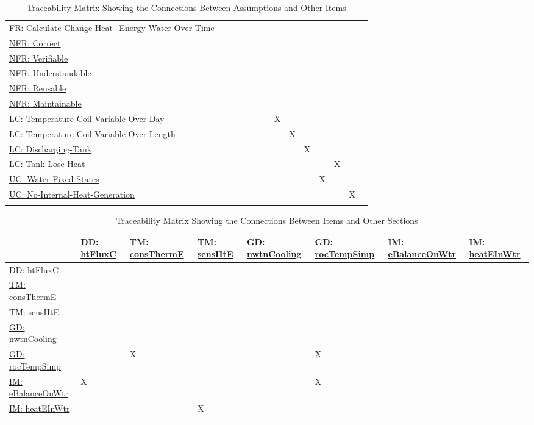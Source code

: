 \documentclass[12pt]{article}
\begin{document}
\begin{longtable}{l l l l l l l l l l l l l l}
\\
\hyperref[calcChgHeatEnergyWtrOverTime]{FR: Calculate-Change-Heat\_Energy-Water-Over-Time} &  &  &  &  &  &  &  &  &  &  &  &  & 
\\
\hyperref[correct]{NFR: Correct} &  &  &  &  &  &  &  &  &  &  &  &  & 
\\
\hyperref[verifiable]{NFR: Verifiable} &  &  &  &  &  &  &  &  &  &  &  &  & 
\\
\hyperref[understandable]{NFR: Understandable} &  &  &  &  &  &  &  &  &  &  &  &  & 
\\
\hyperref[reusable]{NFR: Reusable} &  &  &  &  &  &  &  &  &  &  &  &  & 
\\
\hyperref[maintainable]{NFR: Maintainable} &  &  &  &  &  &  &  &  &  &  &  &  & 
\\
\hyperref[likeChgTCVOD]{LC: Temperature-Coil-Variable-Over-Day} &  &  &  &  &  &  & X &  &  &  &  &  & 
\\
\hyperref[likeChgTCVOL]{LC: Temperature-Coil-Variable-Over-Length} &  &  &  &  &  &  &  & X &  &  &  &  & 
\\
\hyperref[likeChgDT]{LC: Discharging-Tank} &  &  &  &  &  &  &  &  & X &  &  &  & 
\\
\hyperref[likeChgTLH]{LC: Tank-Lose-Heat} &  &  &  &  &  &  &  &  &  &  & X &  & 
\\
\hyperref[unlikeChgWFS]{UC: Water-Fixed-States} &  &  &  &  &  &  &  &  &  & X &  &  & 
\\
\hyperref[unlikeChgNIHG]{UC: No-Internal-Heat-Generation} &  &  &  &  &  &  &  &  &  &  &  & X & 
\\
\bottomrule
\caption{Traceability Matrix Showing the Connections Between Assumptions and Other Items}
\label{Table:TraceMatAvsAll}
\end{longtable}
\begin{longtable}{l l l l l l l l}
\toprule
\textbf{} & \textbf{\hyperref[DD:htFluxC]{DD: htFluxC}} & \textbf{\hyperref[TM:consThermE]{TM: consThermE}} & \textbf{\hyperref[TM:sensHtE]{TM: sensHtE}} & \textbf{\hyperref[GD:nwtnCooling]{GD: nwtnCooling}} & \textbf{\hyperref[GD:rocTempSimp]{GD: rocTempSimp}} & \textbf{\hyperref[IM:eBalanceOnWtr]{IM: eBalanceOnWtr}} & \textbf{\hyperref[IM:heatEInWtr]{IM: heatEInWtr}}
\\
\midrule
\endhead
\hyperref[DD:htFluxC]{DD: htFluxC} &  &  &  &  &  &  & 
\\
\hyperref[TM:consThermE]{TM: consThermE} &  &  &  &  &  &  & 
\\
\hyperref[TM:sensHtE]{TM: sensHtE} &  &  &  &  &  &  & 
\\
\hyperref[GD:nwtnCooling]{GD: nwtnCooling} &  &  &  &  &  &  & 
\\
\hyperref[GD:rocTempSimp]{GD: rocTempSimp} &  & X &  &  & X &  & 
\\
\hyperref[IM:eBalanceOnWtr]{IM: eBalanceOnWtr} & X &  &  &  & X &  & 
\\
\hyperref[IM:heatEInWtr]{IM: heatEInWtr} &  &  & X &  &  &  & 
\\
\bottomrule
\caption{Traceability Matrix Showing the Connections Between Items and Other Sections}
\label{Table:TraceMatRefvsRef}
\end{longtable}
\end{document}
